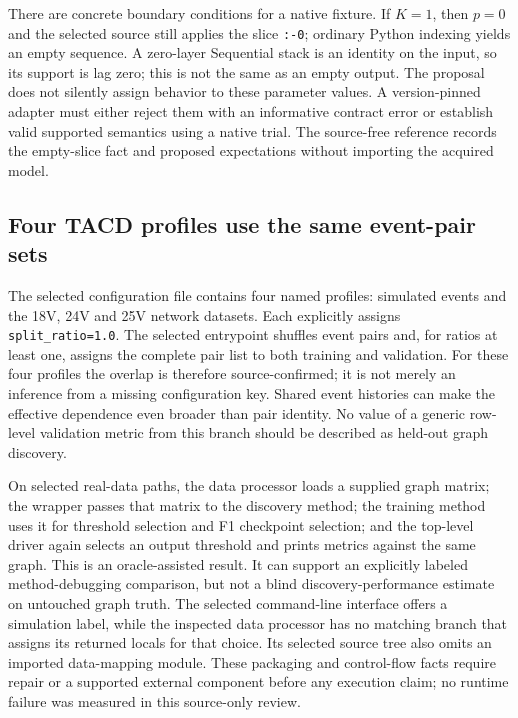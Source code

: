 There are concrete boundary conditions for a native fixture. If $K=1$, then $p=0$ and the
selected source still applies the slice \texttt{:-0}; ordinary Python indexing yields an empty
sequence. A zero-layer Sequential stack is an identity on the input, so its support is lag zero; this is not the same as an empty output. The proposal does not
silently assign behavior to these parameter values. A version-pinned adapter must either reject
them with an informative contract error or establish valid supported semantics using a native
trial. The source-free reference records the empty-slice fact and proposed expectations without
importing the acquired model.\citep{exec28_at_protocol_reference}

\subsection{Four TACD profiles use the same event-pair sets}
The selected configuration file contains four named profiles: simulated events and the 18V,
24V and 25V network datasets. Each explicitly assigns \texttt{split\_ratio=1.0}. The selected
entrypoint shuffles event pairs and, for ratios at least one, assigns the complete pair list to
both training and validation. For these four profiles the overlap is therefore source-confirmed;
it is not merely an inference from a missing configuration key. Shared event histories can make
the effective dependence even broader than pair identity. No value of a generic row-level
validation metric from this branch should be described as held-out graph discovery.
\citep{exec28_at_tacd_protocol}

On selected real-data paths, the data processor loads a supplied graph matrix; the wrapper
passes that matrix to the discovery method; the training method uses it for threshold selection
and F1 checkpoint selection; and the top-level driver again selects an output threshold and prints
metrics against the same graph. This is an oracle-assisted result. It can support an explicitly
labeled method-debugging comparison, but not a blind discovery-performance estimate on untouched
graph truth. The selected command-line interface offers a simulation label, while the inspected
data processor has no matching branch that assigns its returned locals for that choice. Its
selected source tree also omits an imported data-mapping module. These packaging and control-flow
facts require repair or a supported external component before any execution claim; no runtime
failure was measured in this source-only review.\citep{exec28_at_tacd_protocol}

